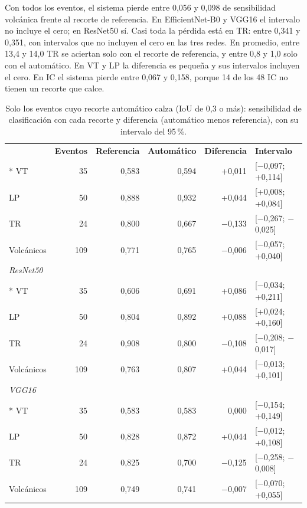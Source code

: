 Con todos los eventos, el sistema pierde entre 0,056 y 0,098 de sensibilidad
volcánica frente al recorte de referencia. En EfficientNet-B0 y VGG16 el
intervalo no incluye el cero; en ResNet50 sí. Casi toda la pérdida está en TR:
entre 0,341 y 0,351, con intervalos que no incluyen el cero en las tres redes.
En promedio, entre 13,4 y 14,0 TR se aciertan solo con el recorte de
referencia, y entre 0,8 y 1,0 solo con el automático. En VT y LP la
diferencia es pequeña y sus intervalos incluyen el cero. En IC el sistema
pierde entre 0,067 y 0,158, porque 14 de los 48 IC no tienen un recorte que
calce.

{\small
\setlength{\tabcolsep}{3.5pt}
\begin{longtable}{lrrrrl}
\caption{Solo los eventos cuyo recorte automático calza (IoU de 0,3 o más):
sensibilidad de clasificación con cada recorte y diferencia (automático menos
referencia), con su intervalo del 95\,\%.}\label{tab:res-referencia-calza}\\
\cabecera{\textbf{Clase} & \textbf{Eventos} & \textbf{Referencia} & \textbf{Automático} & \textbf{Diferencia} & \textbf{Intervalo}}{6}
\multicolumn{6}{l}{\textit{EfficientNet-B0}}\\*
VT & 35 & 0,583 & 0,594 & +0,011 & [$-$0,097; +0,114] \\
LP & 50 & 0,888 & 0,932 & +0,044 & [+0,008; +0,084] \\
TR & 24 & 0,800 & 0,667 & $-$0,133 & [$-$0,267; $-$0,025] \\
Volcánicos & 109 & 0,771 & 0,765 & $-$0,006 & [$-$0,057; +0,040] \\
\midrule
\multicolumn{6}{l}{\textit{ResNet50}}\\*
VT & 35 & 0,606 & 0,691 & +0,086 & [$-$0,034; +0,211] \\
LP & 50 & 0,804 & 0,892 & +0,088 & [+0,024; +0,160] \\
TR & 24 & 0,908 & 0,800 & $-$0,108 & [$-$0,208; $-$0,017] \\
Volcánicos & 109 & 0,763 & 0,807 & +0,044 & [$-$0,013; +0,101] \\
\midrule
\multicolumn{6}{l}{\textit{VGG16}}\\*
VT & 35 & 0,583 & 0,583 & 0,000 & [$-$0,154; +0,149] \\
LP & 50 & 0,828 & 0,872 & +0,044 & [$-$0,012; +0,108] \\
TR & 24 & 0,825 & 0,700 & $-$0,125 & [$-$0,258; $-$0,008] \\
Volcánicos & 109 & 0,749 & 0,741 & $-$0,007 & [$-$0,070; +0,055] \\
\end{longtable}
}

